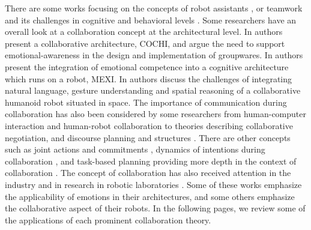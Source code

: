 There are some works focusing on the concepts of robot assistants
\cite{clancey:agent-assistants-collaboration}, or teamwork and its challenges in
cognitive and behavioral levels
\cite{nikolaidis:collaboration-joint-action}
\cite{scerri:prototype-distributed-teams}. Some researchers have an overall look
at a collaboration concept at the architectural level. In
\cite{garcia:collaboration-emotional-awareness} authors present a collaborative
architecture, COCHI, and argue the need to support emotional-awareness in the
design and implementation of groupwares. In
\cite{esau:integrating-emotion-collaboration} authors present the integration of
emotional competence into a cognitive architecture which runs on a robot, MEXI.
In \cite{sofge:collaboration-humanoid-space} authors discuss the challenges of
integrating natural language, gesture understanding and spatial reasoning of a
collaborative humanoid robot situated in space. The importance of communication
during collaboration has also been considered by some researchers from
human-computer interaction and human-robot collaboration
\cite{clair:action-intention-collaboraiton}
\cite{matignon:verbal-nonverbal-collaboration} \cite{rich:discourse} to theories
describing collaborative negotiation, and discourse planning and structures
\cite{andriessen:disourse-planning} \cite{grosz:discourse-structure}
\cite{sidner:discourse-collaborative-negotiation}. There are other concepts such
as joint actions and commitments \cite{grosz:intention-dynamics-collaboration},
dynamics of intentions during collaboration \cite{levesque:acting-together}, and
task-based planning providing more depth in the context of collaboration
\cite{burghart:cognitive-architecture-robot} \cite{rich:cea}. The concept of
collaboration has also received attention in the industry and in research in
robotic laboratories \cite{green:collaboration-literature-review}. Some of these
works emphasize the applicability of emotions in their architectures, and some
others emphasize the collaborative aspect of their robots. In the following
pages, we review some of the applications of each prominent collaboration
theory.\\

